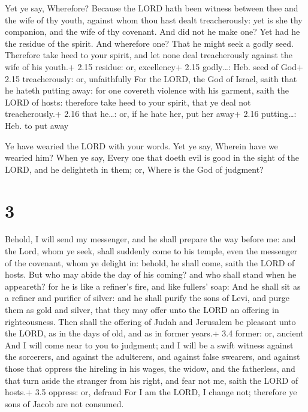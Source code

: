  Yet ye say, Wherefore? Because the LORD hath been
witness between thee and the wife of thy youth, against whom thou hast
dealt treacherously: yet is she thy companion, and the wife of thy
covenant.  And did not he make one? Yet had he the residue
of the spirit. And wherefore one? That he might seek a godly seed.
Therefore take heed to your spirit, and let none deal treacherously
against the wife of his youth.+ 2.15 residue: or, excellency+ 2.15
godly\ldots: Heb. seed of God+ 2.15 treacherously: or, unfaithfully
 For the LORD, the God of Israel, saith that he hateth
putting away: for one covereth violence with his garment, saith the LORD
of hosts: therefore take heed to your spirit, that ye deal not
treacherously.+ 2.16 that he\ldots: or, if he hate her, put her away+
2.16 putting\ldots: Heb. to put away

 Ye have wearied the LORD with your words. Yet ye say,
Wherein have we wearied him? When ye say, Every one that doeth evil is
good in the sight of the LORD, and he delighteth in them; or, Where is
the God of judgment?

\hypertarget{section-2}{%
\section{3}\label{section-2}}

 Behold, I will send my messenger, and he shall prepare the
way before me: and the Lord, whom ye seek, shall suddenly come to his
temple, even the messenger of the covenant, whom ye delight in: behold,
he shall come, saith the LORD of hosts.  But who may abide
the day of his coming? and who shall stand when he appeareth? for he is
like a refiner's fire, and like fullers' soap:  And he shall
sit as a refiner and purifier of silver: and he shall purify the sons of
Levi, and purge them as gold and silver, that they may offer unto the
LORD an offering in righteousness.  Then shall the offering
of Judah and Jerusalem be pleasant unto the LORD, as in the days of old,
and as in former years.+ 3.4 former: or, ancient  And I will
come near to you to judgment; and I will be a swift witness against the
sorcerers, and against the adulterers, and against false swearers, and
against those that oppress the hireling in his wages, the widow, and the
fatherless, and that turn aside the stranger from his right, and fear
not me, saith the LORD of hosts.+ 3.5 oppress: or, defraud 
For I am the LORD, I change not; therefore ye sons of Jacob are not
consumed.

